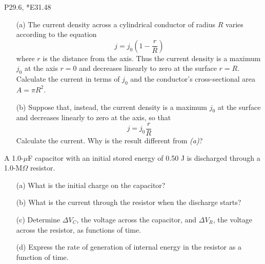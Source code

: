 \documentclass[11pt,letterpaper,boxed]{pset}
\begin{document}
    \begin{center}
        P29.6, *E31.48
    \end{center}
    
    \begin{problem} [P29.6]
    \begin{itemize}
        \item [(a)] The current density across a cylindrical conductor of radius $R$ varies according to the equation 
        \[j = j_0 (1 - \frac{r}{R})\]
        where $r$ is the distance from the axis. Thus the current density is a maximum $j_0$ at the axis $r=0$ and decreases linearly to zero at the surface $r=R$. Calculate the current in terms of $j_0$ and the conductor's cross-sectional area $A=\pi R^2$.
        \item [(b)] Suppose that, instead, the current density is a maximum $j_0$ at the surface and decreases linearly to zero at the axis, so that
        \[j = j_0\frac{r}{R}\]
        Calculate the current. Why is the result different from \textit{(a)}?
    \end{itemize}
    \end{problem}
    \newpage
    
    \begin{problem} [*E31.48]
    A 1.0-$\mu$F capacitor with an initial stored energy of 0.50 J is discharged through a 1.0-M$\Omega$ resistor. 
    
    \begin{itemize}
        \item [(a)] What is the initial charge on the capacitor?
        \item [(b)] What is the current through the resistor when the discharge starts?
        \item [(c)] Determine $\Delta V_C$, the voltage across the capacitor, and $\Delta V_R$, the voltage across the resistor, as functions of time.
        \item [(d)] Express the rate of generation of internal energy in the resistor as a function of time.
    \end{itemize}
    \end{problem}
    \newpage
\end{document}

